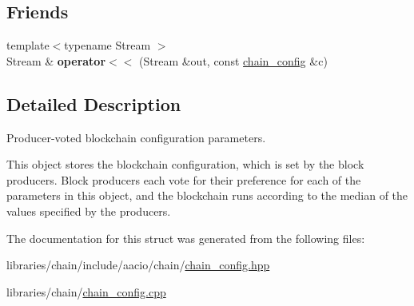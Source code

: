 \subsection*{Friends}
\begin{DoxyCompactItemize}
\item 
\mbox{\label{structaacio_1_1chain_1_1chain__config_acdcac80cccd4750725d548535069c43d}} 
{\footnotesize template$<$typename Stream $>$ }\\Stream \& {\bfseries operator$<$$<$} (Stream \&out, const \mbox{\hyperlink{structaacio_1_1chain_1_1chain__config}{chain\+\_\+config}} \&c)
\end{DoxyCompactItemize}


\subsection{Detailed Description}
Producer-\/voted blockchain configuration parameters. 

This object stores the blockchain configuration, which is set by the block producers. Block producers each vote for their preference for each of the parameters in this object, and the blockchain runs according to the median of the values specified by the producers. 

The documentation for this struct was generated from the following files\+:\begin{DoxyCompactItemize}
\item 
libraries/chain/include/aacio/chain/\mbox{\hyperlink{chain__config_8hpp}{chain\+\_\+config.\+hpp}}\item 
libraries/chain/\mbox{\hyperlink{chain__config_8cpp}{chain\+\_\+config.\+cpp}}\end{DoxyCompactItemize}
